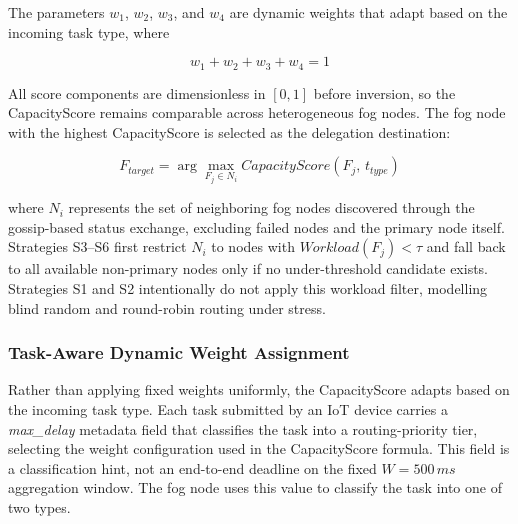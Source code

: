 \documentclass[conference]{IEEEtran}
\begin{document}
    The parameters $w_1$, $w_2$, $w_3$, and $w_4$ are dynamic weights that adapt based on the incoming task type, where

    \begin{equation}
    w_1 + w_2 + w_3 + w_4 = 1
    \end{equation}

    All score components are dimensionless in $[0,1]$ before inversion, so the CapacityScore remains comparable across heterogeneous fog nodes. The fog node with the highest CapacityScore is selected as the delegation destination:

    \begin{equation}
    F_{target} = \arg\max_{F_j \in N_i} CapacityScore(F_j,\,t_{type})
    \end{equation}

    where $N_i$ represents the set of neighboring fog nodes discovered through the gossip-based status exchange, excluding failed nodes and the primary node itself. Strategies S3--S6 first restrict $N_i$ to nodes with $Workload(F_j)<\tau$ and fall back to all available non-primary nodes only if no under-threshold candidate exists. Strategies S1 and S2 intentionally do not apply this workload filter, modelling blind random and round-robin routing under stress.


    \subsubsection{Task-Aware Dynamic Weight Assignment}

    Rather than applying fixed weights uniformly, the CapacityScore adapts based on the incoming task type. Each task submitted by an IoT device carries a \textit{max\_delay} metadata field that classifies the task into a routing-priority tier, selecting the weight configuration used in the CapacityScore formula. This field is a classification hint, not an end-to-end deadline on the fixed $W=500\,ms$ aggregation window. The fog node uses this value to classify the task into one of two types.

    \begin{table}[htbp]
    \caption{Task Classification Based on Delay Requirement}
    \label{table:task-classification}
    \centering
    \end{table}
\end{document}
